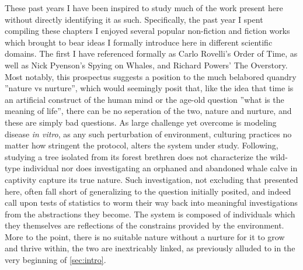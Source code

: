 
These past years I have been inspired to study much of the work present here without directly identifying it as such. Specifically, the past year I spent compiling these chapters I enjoyed several popular non-fiction and fiction works which brought to bear ideas I formally introduce here in different scientific domains. The first I have referenced formally as Carlo Rovelli's Order of Time\cite{rovelli}, as well as Nick Pyenson's Spying on Whales\cite{pyenson},  and Richard Powers' The Overstory\cite{powers}. Most notably, this prospectus suggests a position to the much belabored quandry ''nature vs nurture'', which would seemingly posit that, like the idea that time is an artificial construct of the human mind or the age-old question ''what is the meaning of life'', there can be no seperation of the two, nature and nurture, and these are simply bad questions. As large challenge yet overcome is modeling disease \emph{in vitro}, as any such perturbation of environment, \ie culturing practices no matter how stringent the protocol, alters the system under study. Following, studying a tree isolated from its forest brethren does not characterize the wild-type individual nor does investigating an orphaned and abandoned whale calve in captivity capture its true nature. Such investigation, not excluding that presented here, often fall short of generalizing to the question initially posited, and indeed call upon tests of statistics to worm their way back into meaningful investigations from the abstractions they become. The system is composed of individuals which they themselves are reflections of the constrains provided by the environment. More to the point, there is no suitable nature without a nurture for it to grow and thrive within, the two are inextricably linked, as previously alluded to in the very beginning of \cref{sec:intro}.





